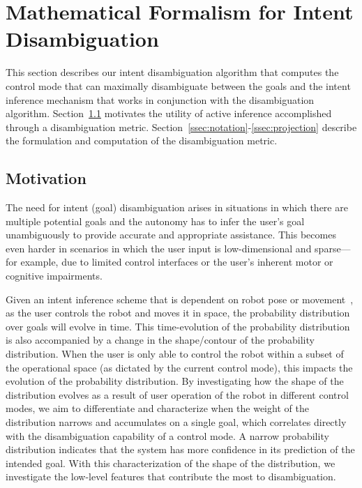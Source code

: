 \documentclass[natbib, twocolumn]{svjour3}          %
\begin{document}
\section{Mathematical Formalism for Intent Disambiguation}\label{sec:ma}
This section describes our intent disambiguation algorithm that computes the control mode that can maximally disambiguate between the goals and the intent inference mechanism that works in conjunction with the disambiguation algorithm. Section~\ref{ssec:motivation} motivates the utility of active inference accomplished through a disambiguation metric.
Section~\ref{ssec:notation}-\ref{ssec:projection} describe the formulation and computation of the disambiguation metric. 

\subsection{Motivation}\label{ssec:motivation}

The need for intent (goal) disambiguation arises in situations in which there are multiple potential goals and the autonomy has to infer the user's goal unambiguously to provide accurate and appropriate assistance. This becomes even harder in scenarios in which the user input is low-dimensional and sparse---for example, due to limited control interfaces or the user's inherent motor or cognitive impairments.

Given an intent inference scheme that is dependent on robot pose or movement~\citep{kelley2008understanding, wang2013probabilistic}, as the user controls the robot and moves it in space, the probability distribution over goals will evolve in time. This time-evolution of the probability distribution is also accompanied by a change in the shape/contour of the probability distribution. When the user is only able to control the robot within a subset of the operational space (as dictated by the current control mode), this impacts the evolution of the probability distribution. By investigating how the shape of the distribution evolves as a result of user operation of the robot in different control modes, we aim to differentiate and characterize when the weight of the distribution narrows and accumulates on a single goal, which correlates directly with the disambiguation capability of a control mode. A narrow probability distribution indicates that the system has more confidence in its prediction of the intended goal. With this characterization of the shape of the distribution, we investigate the low-level features that contribute the most to disambiguation.
\end{document}

